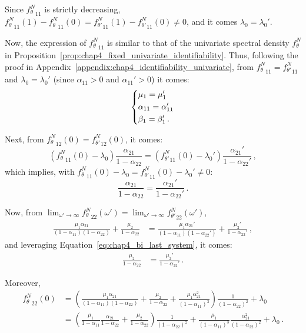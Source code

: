 \begin{subappendices}
Since ${f_\theta^N}_{11}$ is strictly decreasing, ${f_\theta^N}_{11}(1)-{f_\theta^N}_{11}(0) = {f_{\theta'}^N}_{11}(1)-{f_{\theta'}^N}_{11}(0) \neq 0$, and it comes $\lambda_0 = \lambda_0'$.

Now, the expression of ${f_\theta^N}_{11}$ is similar to that of the univariate spectral density $f_\theta^N$ in Proposition~\ref{prop:chap4_fixed_univariate_identifiability}.
Thus, following the proof in Appendix~\ref{appendix:chap4_identifiability_univariate}, from ${f_\theta^N}_{11} = {f_{\theta'}^N}_{11}$ and $\lambda_0 = \lambda_0'$
(since $\alpha_{11} > 0$ and $\alpha_{11}'> 0$)
it comes:
\[
\begin{dcases}
\mu_1 = \mu_1' \nonumber\\
\alpha_{11} = \alpha_{11}'\nonumber\\
\beta_1 = \beta_1'\nonumber\,.
\end{dcases}
\]

Next, from ${f_\theta^N}_{12}(0) = {f_{\theta'}^N}_{12}(0)$, it comes:
\begin{equation*}
\left( {f_\theta^N}_{11}(0) - \lambda_0 \right) \frac{\alpha_{21}}{1-\alpha_{22}}
=
\left( {f_{\theta'}^N}_{11}(0) - \lambda_0' \right) \frac{\alpha_{21}'}{1-\alpha_{22}'} \,,
\end{equation*}
which implies, with ${f_\theta^N}_{11}(0) - \lambda_0 = {f_{\theta'}^N}_{11}(0) - \lambda_0' \neq 0$:
\begin{equation}\label{eq:chap4_bi_last_system}
\frac{\alpha_{21}}{1-\alpha_{22}} = \frac{\alpha_{21}'}{1-\alpha_{22}'}\,.
\end{equation}

Now, from $\lim_{\omega' \to \infty} {f_\theta^N}_{22}(\omega') = \lim_{\omega' \to \infty} {f_{\theta'}^N}_{22}(\omega')$,
\begin{align*}
\frac{\mu_1 \alpha_{21}}{(1-\alpha_{11})(1-\alpha_{22})} + \frac{\mu_2}{1-\alpha_{22}} &= \frac{\mu_1 \alpha_{21}'}{(1-\alpha_{11})(1-\alpha_{22}')} + \frac{\mu_2'}{1-\alpha_{22}'} \,,
\end{align*}
and leveraging Equation~\eqref{eq:chap4_bi_last_system}, it comes:
\begin{align}\label{eq:chap4_bi_last_equation}
\frac{\mu_2}{1-\alpha_{22}} &= \frac{\mu_2'}{1-\alpha_{22}'}\,.
\end{align}

Moreover,
\begin{align*}
{f_\theta^N}_{22}(0)
&= \left( \frac{\mu_1 \alpha_{21}}{(1-\alpha_{11})(1-\alpha_{22})} + \frac{\mu_2}{1-\alpha_{22}} + \frac{\mu_1\alpha_{21}^2}{(1-\alpha_{11})^3} \right) \frac{1}{(1-\alpha_{22})^2} + \lambda_0 \\
&= \left(
\frac{\mu_1}{1-\alpha_{11}} \frac{\alpha_{21}}{1-\alpha_{22}} +
\frac{\mu_2}{1-\alpha_{22}}
\right) \frac{1}{(1-\alpha_{22})^2} +
\frac{\mu_1}{(1-\alpha_{11})^3} \frac{\alpha_{21}^2}{(1-\alpha_{22})^2} + \lambda_0 \,.
\end{align*}


\end{subappendices}
